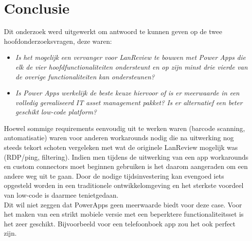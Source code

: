 
\chapter{Conclusie}
\label{ch:conclusie}


Dit onderzoek werd uitgewerkt om antwoord te kunnen geven op de twee hoofdonderzoeksvragen, deze waren:
\begin{itemize}
    \item \textit{Is het mogelijk een vervanger voor LanReview te bouwen met Power Apps die elk de vier hoofdfunctionaliteiten ondersteunt en op zijn minst drie vierde van de overige functionaliteiten kan ondersteunen?}
    \item \textit{Is Power Apps werkelijk de beste keuze hiervoor of is er meerwaarde in een volledig gerealiseerd IT asset management pakket? Is er alternatief een beter geschikt low-code platform?}
\end{itemize}

Hoewel sommige requirements eenvoudig uit te werken waren (barcode scanning, automatisatie) waren voor anderen workarounds nodig die na uitwerking nog steeds tekort schoten vergeleken met wat de originele LanReview mogelijk was (RDP/ping, filtering). Indien men tijdens de uitwerking van een app workarounds en custom connectors moet beginnen gebruiken is het daarom aangeraden om een andere weg uit te gaan. Door de nodige tijdsinvestering kan evengoed iets opgesteld worden in een traditionele ontwikkelomgeving en het sterkste voordeel van low-code is daarmee tenietgedaan.\\
Dit wil niet zeggen dat PowerApps geen meerwaarde biedt voor deze case. Voor het maken van een strikt mobiele versie met een beperktere functionaliteitsset is het zeer geschikt. Bijvoorbeeld voor een telefoonboek app zou het ook perfect zijn.

